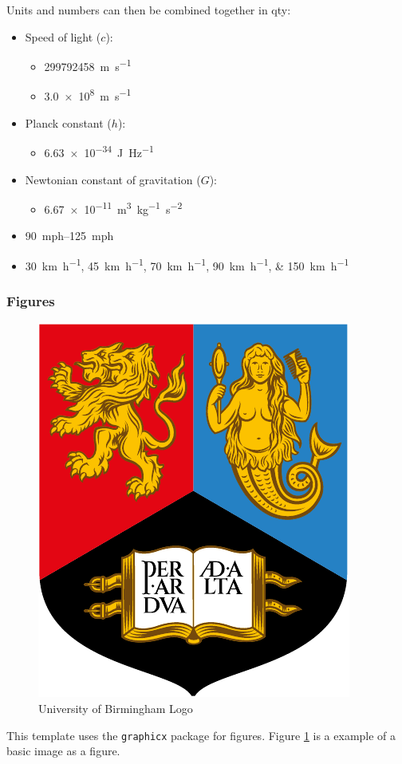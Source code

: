 Units and numbers can then be combined together in qty:
\begin{itemize}
    \item Speed of light ($c$): 
        \begin{itemize}
            \item \qty{299792458}{m.s^{-1}}
            \item \qty{3.0e8}{\metre\per\second}
        \end{itemize}
    \item Planck constant ($h$): 
        \begin{itemize}
            \item \qty{6.63e-34}{J.Hz^{-1}}
        \end{itemize}
    \item Newtonian constant of gravitation ($G$): 
        \begin{itemize}
            \item \qty{6.67e-11}{m^3.kg^{-1}.s^{-2}}
        \end{itemize}
    \item \qtyrange{90}{125}{mph}
    \item \qtylist{30;45;70;90;150}{\km \per \hour}
\end{itemize}

\subsubsection{Figures}

\begin{figure}[H]
    \centering
    \includegraphics[width=0.3\linewidth]{images/uob_logo.pdf}
    \caption{University of Birmingham Logo}
    \label{fig:uob_logo}
\end{figure}

This template uses the \verb|graphicx| package for figures. Figure \ref{fig:uob_logo} is a example of a  basic image as a figure.



